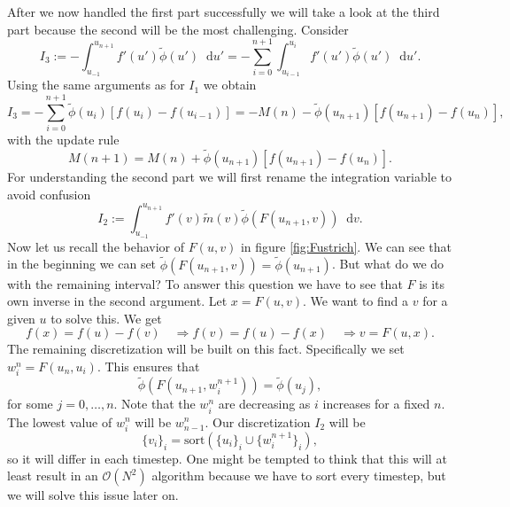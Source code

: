 \documentclass[12pt,a4paper,twoside, open=right]{scrreprt}
\theoremstyle{definition}
\theoremstyle{plain}
\newcommand{\D}{\mathop{}\!\mathrm{d}}
\begin{document}
\par After we now handled the first part successfully we will take a look at the third part because the second will be the most challenging. Consider
\begin{equation}
    I_3:=-\int_{u_{-1}}^{u_{n+1}}f'(u')\tilde\phi(u')\D u' = -\sum_{i=0}^{n+1}\int_{u_{i-1}}^{u_i}f'(u')\tilde\phi(u')\D u'.
\end{equation} Using the same arguments as for $I_1$ we obtain
\begin{equation}
    I_3 = -\sum_{i=0}^{n+1}\tilde\phi(u_i)[f(u_i)-f(u_{i-1})] = -M(n) -\tilde\phi(u_{n+1})[f(u_{n+1})-f(u_{n})],
\end{equation}
with the update rule 
\begin{equation}
    M(n+1) = M(n) + \tilde\phi(u_{n+1})[f(u_{n+1})-f(u_{n})].
\end{equation}
For understanding the second part we will first rename the integration variable to avoid confusion
\begin{equation}
    I_2:=\int_{u_{-1}}^{u_{n+1}}f'(v)\tilde{m}(v)\tilde{\phi}(F(u_{n+1},v))\D v.
\end{equation}
Now let us recall the behavior of $F(u,v)$ in figure \ref{fig:Fustrich}. We can see that in the beginning we can set $\tilde\phi(F(u_{n+1},v))=\tilde\phi(u_{n+1})$. But what do we do with the remaining interval? To answer this question we have to see that $F$ is its own inverse in the second argument. Let $x = F(u,v)$. We want to find a $v$ for a given $u$ to solve this. We get
\begin{equation}
    f(x)=f(u)-f(v)\quad\Rightarrow f(v)=f(u)-f(x)\quad\Rightarrow v= F(u,x).
\end{equation}
The remaining discretization will be built on this fact. Specifically we set $w_i^n=F(u_n,u_i)$. This ensures that 
\begin{equation}
    \tilde\phi(F(u_{n+1},w^{n+1}_i))=\tilde{\phi}(u_j),
\end{equation}
for some $j=0,\dotsc,n$. Note that the $w_i^n$ are decreasing as $i$ increases for a fixed $n$. The lowest value of $w_i^n$ will be $w_{n-1}^n$. Our discretization $I_2$ will be 
\begin{equation}
    \{v_i\}_i=\text{sort}(\{u_i\}_i\cup \{w_i^{n+1}\}_i),
\end{equation}
so it will differ in each timestep. One might be tempted to think that this will at least result in an $\mathcal{O}(N^2)$ algorithm because we have to sort every timestep, but we will solve this issue later on.
\end{document}
